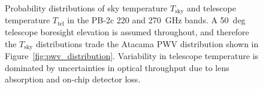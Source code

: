 \begin{figure}[!t]
    \centering
    \hfill
    \caption{Probability distributions of sky temperature $T_{\mathrm{sky}}$ and telescope temperature $T_{\mathrm{tel}}$ in the PB-2c 220 and 270~GHz bands. A 50~deg telescope boresight elevation is assumed throughout, and therefore the $T_{\mathrm{sky}}$ distributions trade the Atacama PWV distribution shown in Figure~\ref{fig:pwv_distribution}. Variability in telescope temperature is dominated by uncertainties in optical throughput due to lens absorption and on-chip detector loss.}
    \label{fig:pb2c_psat_tel_sky_temp}
\end{figure}


